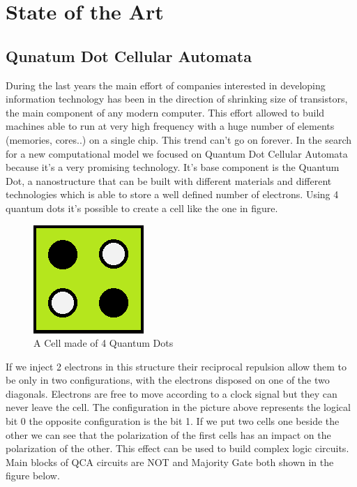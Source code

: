 \chapter{State of the Art}\label{sec:state_of_art}
\section{Qunatum Dot Cellular Automata}
During the last years the main effort of companies interested in developing information technology has been in the direction of shrinking size of transistors, the main component of any modern computer. This effort allowed to build machines able to run at very high frequency with a huge number of elements (memories, cores..) on a single chip.  This trend can't go on forever. In the search for a new computational model we focused on Quantum Dot Cellular Automata because it's a very promising technology. It's base component is the Quantum Dot, a nanostructure that can be built with different materials and different technologies which is able to store a well defined number of electrons. Using 4 quantum dots it's possible to create a cell like the one in figure. 

\begin{figure}
\centering
\includegraphics[scale=0.8]{img/_Cell1.png}
\caption{A Cell made of 4 Quantum Dots}
\label{cell}
\end{figure}

If we inject 2 electrons in this structure their reciprocal repulsion allow them to be only in two configurations, with the electrons disposed on one of the two diagonals. Electrons are free to move according to a clock signal but they can never leave the cell.
The configuration in the picture above represents the logical bit 0 the opposite configuration is the bit 1. 
If we put two cells one beside the other we can see that the polarization of the first cells has an impact on the polarization of the other. This effect can be used to build complex logic circuits. Main blocks of QCA circuits are NOT and Majority Gate both shown in the figure below.

